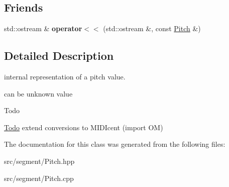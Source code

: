 \subsection*{Friends}
\begin{DoxyCompactItemize}
\item 
\mbox{\label{classPitch_ae9c4c4f6656355cc6d8ee538d2441a58}} 
std\+::ostream \& {\bfseries operator$<$$<$} (std\+::ostream \&, const \mbox{\hyperlink{classPitch}{Pitch}} \&)
\end{DoxyCompactItemize}


\subsection{Detailed Description}
internal representation of a pitch value. 

can be unknown value \begin{DoxyRefDesc}{Todo}
\item[\mbox{\hyperlink{todo__todo000027}{Todo}}]extend conversions to M\+I\+D\+Icent (import OM) \end{DoxyRefDesc}


The documentation for this class was generated from the following files\+:\begin{DoxyCompactItemize}
\item 
src/segment/Pitch.\+hpp\item 
src/segment/Pitch.\+cpp\end{DoxyCompactItemize}
